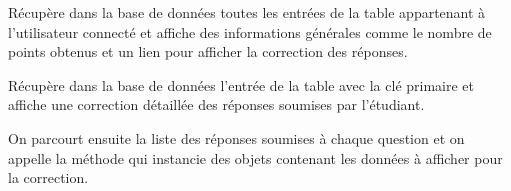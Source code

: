 \documentclass[a4paper,11pt,openany,oneside]{sphinxmanual}
\begin{document}

\begin{fulllineitems}
\label{source:quiz.views.completed_quizzes}
Récupère dans la base de données toutes les entrées de la table 
appartenant à l'utilisateur connecté et affiche des informations générales comme
le nombre de points obtenus et un lien pour afficher la correction des réponses.

\end{fulllineitems}


\begin{fulllineitems}
\label{source:quiz.views.correct}
Récupère dans la base de données l'entrée de la table  avec
la clé primaire  et affiche une correction détaillée des réponses soumises
par l'étudiant.

On parcourt ensuite la liste des réponses soumises à chaque question et on appelle
la méthode  qui instancie des objets contenant les données
à afficher pour la correction.

\end{fulllineitems}

\end{document}
